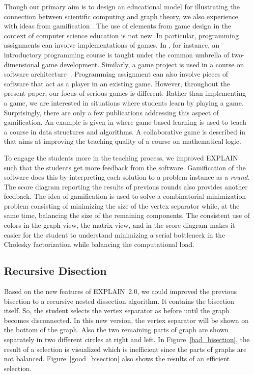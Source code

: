 \documentclass[12pt, twoside]{book}
\begin{document}
Though our primary aim is to design an educational model for illustrating the connection between
scientific computing and graph theory, we also experience with ideas from gamification
\cite{deterding2011:gug,deterding2011}. The use of elements from game design in the context of
computer science education is not new. In particular, programming assignments can involve
implementations of games. In \cite{la2007:gfa}, for instance, an introductory programming course is
taught under the common umbrella of two-dimensional game development. Similarly, a game project is
used in a course on software architecture~\cite{Wang2011:EEU}. Programming assignment can also
involve pieces of software that act as a player in an existing game. However, throughout the
present paper, our focus of serious games is different. Rather than implementing a game, we are
interested in situations where students learn by playing a game. Surprisingly, there are only a few
publications addressing this aspect of gamification. An example is given in
\cite{Hakulinen2011:usg} where game-based learning is used to teach a course in data structures and
algorithms. A collaborative game is described in \cite{shl:bsc} that aims at improving the teaching
quality of a course on mathematical logic.


To engage the students more in the teaching process, we improved EXPLAIN such that the students get
more feedback from the software. Gamification of the software does this by interpreting each
solution to a problem instance as a \textit{round}. The score diagram reporting the results of previous
rounds also provides another feedback. The idea of gamification is used to solve a combinatorial
minimization problem consisting of minimizing the size of the vertex separator while, at the same
time, balancing the size of the remaining components. The consistent use of colors in the graph
view, the matrix view, and in the score diagram makes it easier for the student to understand
minimizing a serial bottleneck in the Cholesky factorization while balancing the computational
load.
\subsection{Recursive Disection}
Based on the new features of \mbox{EXPLAIN 2.0}, we could improved the previous
bisection to a recursive nested dissection algorithm.
It contains the bisection itself. So, the student selects the vertex separator
as before until the graph becomes disconnected.
In this new version, the vertex separator will be shown on the bottom
of the graph. Also the two remaining parts of graph are shown separately
in two different circles at right and left.
In Figure~\ref{bad_bisection}, the result of a selection is visualized which
is inefficient since the parts of graphs are not balanced.
Figure~\ref{good_bisection} also shows the results of an efficient selection.
\end{document}
